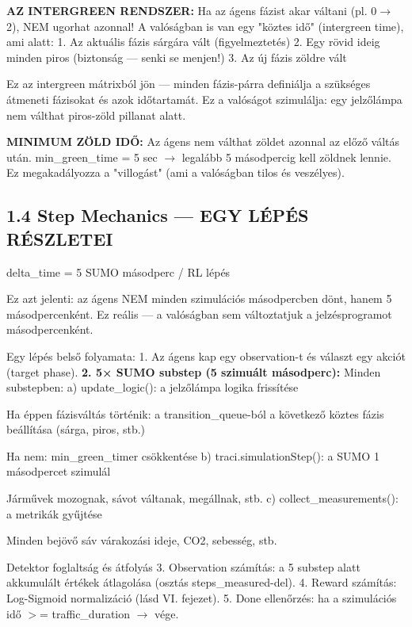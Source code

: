 \documentclass[11pt,a4paper]{article}
\begin{document}
\textbf{AZ INTERGREEN RENDSZER:}
Ha az ágens fázist akar váltani (pl. 0$\rightarrow$2), NEM ugorhat azonnal!
A valóságban is van egy "köztes idő" (intergreen time), ami alatt:
1. Az aktuális fázis sárgára vált (figyelmeztetés)
2. Egy rövid ideig minden piros (biztonság — senki se menjen!)
3. Az új fázis zöldre vált

Ez az intergreen mátrixból jön — minden fázis-párra definiálja a
szükséges átmeneti fázisokat és azok időtartamát. Ez a valóságot
szimulálja: egy jelzőlámpa nem válthat piros-zöld pillanat alatt.

\textbf{MINIMUM ZÖLD IDŐ:}
Az ágens nem válthat zöldet azonnal az előző váltás után.
min\_green\_time = 5 sec $\rightarrow$ legalább 5 másodpercig kell zöldnek lennie.
Ez megakadályozza a "villogást" (ami a valóságban tilos és veszélyes).

\subsection*{1.4 Step Mechanics — EGY LÉPÉS RÉSZLETEI}
delta\_time = 5 SUMO másodperc / RL lépés

Ez azt jelenti: az ágens NEM minden szimulációs másodpercben dönt,
hanem 5 másodpercenként. Ez reális — a valóságban sem változtatjuk
a jelzésprogramot másodpercenként.

Egy lépés belső folyamata:
1. Az ágens kap egy observation-t és választ egy akciót (target phase).
\textbf{2. 5× SUMO substep (5 szimuált másodperc):}
Minden substepben:
a) update\_logic(): a jelzőlámpa logika frissítése
\par\noindent\hspace*{1em}\textbullet{} Ha éppen fázisváltás történik: a transition\_queue-ból
a következő köztes fázis beállítása (sárga, piros, stb.)
\par\noindent\hspace*{1em}\textbullet{} Ha nem: min\_green\_timer csökkentése
b) traci.simulationStep(): a SUMO 1 másodpercet szimulál
\par\noindent\hspace*{1em}\textbullet{} Járművek mozognak, sávot váltanak, megállnak, stb.
c) collect\_measurements(): a metrikák gyűjtése
\par\noindent\hspace*{1em}\textbullet{} Minden bejövő sáv várakozási ideje, CO2, sebesség, stb.
\par\noindent\hspace*{1em}\textbullet{} Detektor foglaltság és átfolyás
3. Observation számítás: a 5 substep alatt akkumulált értékek
átlagolása (osztás steps\_measured-del).
4. Reward számítás: Log-Sigmoid normalizáció (lásd VI. fejezet).
5. Done ellenőrzés: ha a szimulációs idő $>$= traffic\_duration $\rightarrow$ vége.
\end{document}
